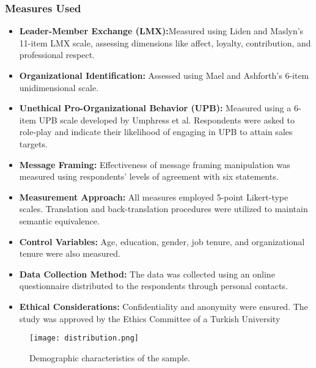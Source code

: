 \documentclass[runningheads]{llncs}
\begin{document}
\subsubsection{Measures Used}
\begin{itemize}
    \item \textbf{Leader-Member Exchange (LMX):}Measured using Liden and Maslyn’s 11-item LMX scale, assessing dimensions like affect, loyalty, contribution, and professional respect.
    \item \textbf{Organizational Identification:} Assessed using Mael and Ashforth’s 6-item unidimensional scale.
    \item \textbf{Unethical Pro-Organizational Behavior (UPB):} Measured using a 6-item UPB scale developed by Umphress et al. Respondents were asked to role-play and indicate their likelihood of engaging in UPB to attain sales targets.
    \item \textbf{Message Framing:} Effectiveness of message framing manipulation was measured using respondents' levels of agreement with six statements. \cite{ref_article4}
    \item \textbf{Measurement Approach:} All measures employed 5-point Likert-type scales. Translation and back-translation procedures were utilized to maintain semantic equivalence.
    \item \textbf{Control Variables:} Age, education, gender, job tenure, and organizational tenure were also measured.
    \item \textbf{Data Collection Method:} The data was collected using an online questionnaire distributed to the respondents through personal contacts. \cite{ref_article5}
    \item \textbf{Ethical Considerations:} Confidentiality and anonymity were ensured. The study was approved by the Ethics Committee of a Turkish University
\end{itemize}
\begin{figure}
\texttt{[image: distribution.png]}
\caption{Demographic characteristics of the sample.} \label{fig1}
\end{figure}
\end{document}

